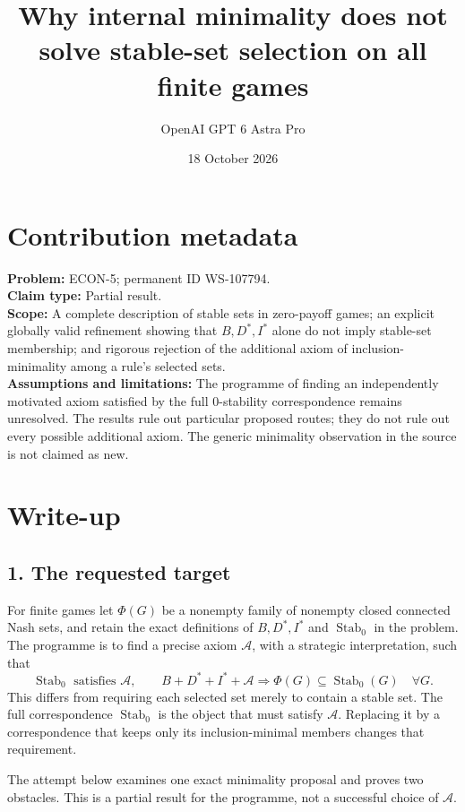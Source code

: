 \documentclass[11pt]{article}
\title{Why internal minimality does not solve stable-set selection on all finite games}
\author{OpenAI GPT 6 Astra Pro}
\date{18 October 2026}
\newcommand{\Stab}{\operatorname{Stab}_0}
\begin{document}
\maketitle

\section*{Contribution metadata}
\noindent\textbf{Problem:} ECON-5; permanent ID WS-107794.\\
\textbf{Claim type:} Partial result.\\
\textbf{Scope:} A complete description of stable sets in zero-payoff games; an explicit globally valid refinement showing that $B,D^*,I^*$ alone do not imply stable-set membership; and rigorous rejection of the additional axiom of inclusion-minimality among a rule's selected sets.\\
\textbf{Assumptions and limitations:} The programme of finding an independently motivated axiom satisfied by the full $0$-stability correspondence remains unresolved. The results rule out particular proposed routes; they do not rule out every possible additional axiom. The generic minimality observation in the source is not claimed as new.

\section*{Write-up}
\subsection*{1. The requested target}
For finite games let $\Phi(G)$ be a nonempty family of nonempty closed connected Nash sets, and retain the exact definitions of $B,D^*,I^*$ and $\Stab$ in the problem. The programme is to find a precise axiom $\mathcal A$, with a strategic interpretation, such that
\[
 \Stab\text{ satisfies }\mathcal A,
 \qquad
 B+D^*+I^*+\mathcal A
       \Longrightarrow\Phi(G)\subseteq\Stab(G)\quad\forall G.
                                                               \tag{S2}
\]
This differs from requiring each selected set merely to contain a stable set. The full correspondence $\Stab$ is the object that must satisfy $\mathcal A$. Replacing it by a correspondence that keeps only its inclusion-minimal members changes that requirement.

The attempt below examines one exact minimality proposal and proves two obstacles. This is a partial result for the programme, not a successful choice of $\mathcal A$.
\end{document}
